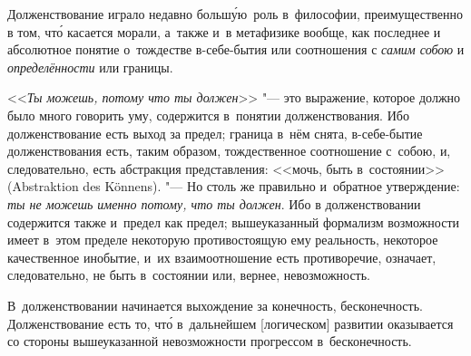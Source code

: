 
Долженствование играло недавно больш\'{у}ю~роль в~философии, преимущественно в
том, чт\'{о} касается морали, а~также и~в метафизике вообще, как последнее и
абсолютное понятие о~тождестве в-себе-бытия или соотношения с
{\em самим собою} и {\em определённости} или границы.

<<{\em Ты можешь, потому что ты должен}>> "--- это выражение,
которое должно было много говорить уму, содержится в~понятии долженствования.
Ибо долженствование есть выход за предел; граница в~нём снята, в-себе-бытие
долженствования есть, таким образом, тождественное соотношение с~собою, и,
следовательно, есть абстракция представления: <<мочь, быть в~состоянии>>
(Abstraktion des Könnens). "--- Но столь же правильно и~обратное утверждение:
{\em ты не можешь именно потому, что ты должен}. Ибо в
долженствовании содержится также и~предел как предел; вышеуказанный
формализм возможности имеет в~этом пределе некоторую противостоящую ему
реальность, некоторое качественное инобытие, и~их взаимоотношение есть
противоречие, означает, следовательно, не быть в~состоянии или, вернее,
невозможность.

В~долженствовании начинается выхождение за конечность, бесконечность.
Долженствование есть то, чт\'{о} в~дальнейшем [логическом] развитии оказывается
со стороны вышеуказанной невозможности прогрессом в~бесконечность.

